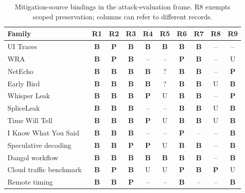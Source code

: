\begin{table}[t]\centering\footnotesize
\caption{Mitigation-source bindings in the attack-evaluation frame. R8 exempts scoped preservation; columns can refer to different records.}\label{tab:family-audit}
\setlength{\tabcolsep}{2.2pt}
\begin{tabularx}{\columnwidth}{@{}Y*{9}{c}@{}}\toprule
Family & R1 & R2 & R3 & R4 & R5 & R6 & R7 & R8 & R9\\\midrule
UI Traces~\cite{uitraces2026} & \textbf{B} & \textbf{P} & \textbf{B} & \textbf{B} & \textbf{B} & \textbf{B} & \textbf{B} & -- & --\\
WRA~\cite{jeong2026wra} & \textbf{B} & \textbf{P} & \textbf{B} & -- & -- & \textbf{P} & \textbf{B} & -- & U\\
NetEcho~\cite{netecho2025} & \textbf{B} & \textbf{B} & \textbf{B} & \textbf{B} & ? & \textbf{B} & \textbf{B} & -- & \textbf{P}\\
Early Bird~\cite{earlybird2025} & \textbf{B} & \textbf{B} & \textbf{B} & \textbf{B} & ? & \textbf{B} & \textbf{B} & U & \textbf{B}\\
Whisper Leak~\cite{whisperleak2025} & \textbf{B} & \textbf{B} & \textbf{B} & \textbf{P} & U & \textbf{B} & \textbf{B} & -- & \textbf{P}\\
SpliceLeak~\cite{spliceleak2026} & \textbf{B} & \textbf{B} & \textbf{B} & -- & -- & \textbf{B} & \textbf{B} & U & \textbf{B}\\
Time Will Tell~\cite{timewilltell2024} & \textbf{B} & \textbf{B} & \textbf{B} & \textbf{P} & U & \textbf{B} & \textbf{B} & U & \textbf{B}\\
I Know What You Said~\cite{gao2025iknow} & \textbf{B} & \textbf{B} & \textbf{B} & -- & -- & \textbf{P} & -- & -- & \textbf{B}\\
Speculative decoding~\cite{wei2024speculation} & \textbf{B} & \textbf{B} & \textbf{P} & \textbf{P} & U & \textbf{B} & \textbf{B} & -- & \textbf{B}\\
Dangol workflow~\cite{dangol2026workflow} & \textbf{B} & \textbf{B} & \textbf{B} & \textbf{B} & \textbf{B} & \textbf{B} & \textbf{B} & -- & \textbf{B}\\
Cloud traffic benchmark~\cite{pouryousef2026traffic} & \textbf{B} & \textbf{P} & \textbf{B} & U & U & \textbf{P} & \textbf{B} & \textbf{P} & U\\
Remote timing~\cite{carlini2024remote} & \textbf{B} & \textbf{B} & \textbf{P} & -- & -- & \textbf{B} & -- & -- & \textbf{B}\\

\end{tabularx}
\end{table}

